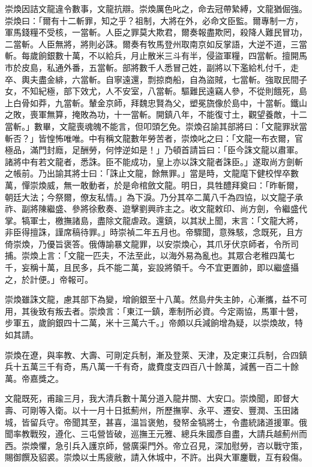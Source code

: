 \begin{pinyinscope}
崇煥因詰文龍違令數事，文龍抗辯。崇煥厲色叱之，命去冠帶縶縛，文龍猶倔強。崇煥曰：「爾有十二斬罪，知之乎？祖制，大將在外，必命文臣監。爾專制一方，軍馬錢糧不受核，一當斬。人臣之罪莫大欺君，爾奏報盡欺罔，殺降人難民冒功，二當斬。人臣無將，將則必誅。爾奏有牧馬登州取南京如反掌語，大逆不道，三當斬。每歲餉銀數十萬，不以給兵，月止散米三斗有半，侵盜軍糧，四當斬。擅開馬市於皮島，私通外番，五當斬。部將數千人悉冒己姓，副將以下濫給札付千，走卒、輿夫盡金緋，六當斬。自寧遠還，剽掠商船，自為盜賊，七當斬。強取民間子女，不知紀極，部下效尤，人不安室，八當斬。驅難民遠竊人參，不從則餓死，島上白骨如莽，九當斬。輦金京師，拜魏忠賢為父，塑冕旒像於島中，十當斬。鐵山之敗，喪軍無算，掩敗為功，十一當斬。開鎮八年，不能復寸土，觀望養敵，十二當斬。」數畢，文龍喪魂魄不能言，但叩頭乞免。崇煥召諭其部將曰：「文龍罪狀當斬否？」皆惶怖唯唯。中有稱文龍數年勞苦者，崇煥叱之曰：「文龍一布衣爾，官極品，滿門封廕，足酬勞，何悖逆如是！」乃頓首請旨曰：「臣今誅文龍以肅軍。諸將中有若文龍者，悉誅。臣不能成功，皇上亦以誅文龍者誅臣。」遂取尚方劍斬之帳前。乃出諭其將士曰：「誅止文龍，餘無罪。」當是時，文龍麾下健校悍卒數萬，憚崇煥威，無一敢動者，於是命棺斂文龍。明日，具牲醴拜奠曰：「昨斬爾，朝廷大法；今祭爾，僚友私情。」為下淚。乃分其卒二萬八千為四協，以文龍子承祚、副將陳繼盛、參將徐敷奏、遊擊劉興祚主之。收文龍敕印、尚方劍，令繼盛代掌。犒軍士，檄撫諸島，盡除文龍虐政。還鎮，以其狀上聞，末言：「文龍大將，非臣得擅誅，謹席稿待罪。」時崇禎二年五月也。帝驟聞，意殊駭，念既死，且方倚崇煥，乃優旨褒答。俄傳諭暴文龍罪，以安崇煥心，其爪牙伏京師者，令所司捕。崇煥上言：「文龍一匹夫，不法至此，以海外易為亂也。其眾合老稚四萬七千，妄稱十萬，且民多，兵不能二萬，妄設將領千。今不宜更置帥，即以繼盛攝之，於計便。」帝報可。

崇煥雖誅文龍，慮其部下為變，增餉銀至十八萬。然島弁失主帥，心漸攜，益不可用，其後致有叛去者。崇煥言：「東江一鎮，牽制所必資。今定兩協，馬軍十營，步軍五，歲餉銀四十二萬，米十三萬六千。」帝頗以兵減餉增為疑，以崇煥故，特如其請。

崇煥在遼，與率教、大壽、可剛定兵制，漸及登萊、天津，及定東江兵制，合四鎮兵十五萬三千有奇，馬八萬一千有奇，歲費度支四百八十餘萬，減舊一百二十餘萬。帝嘉獎之。

文龍既死，甫踰三月，我大清兵數十萬分道入龍井關、大安口。崇煥聞，即督大壽、可剛等入衛。以十一月十日抵薊州，所歷撫寧、永平、遷安、豐潤、玉田諸城，皆留兵守。帝聞其至，甚喜，溫旨褒勉，發帑金犒將士，令盡統諸道援軍。俄聞率教戰歿，遵化、三屯營皆破，巡撫王元雅、總兵朱國彥自盡，大請兵越薊州而西。崇煥懼，急引兵入護京師，營廣渠門外。帝立召見，深加慰勞，咨以戰守策，賜御饌及貂裘。崇煥以士馬疲敝，請入休城中，不許。出與大軍鏖戰，互有殺傷。


\end{pinyinscope}
